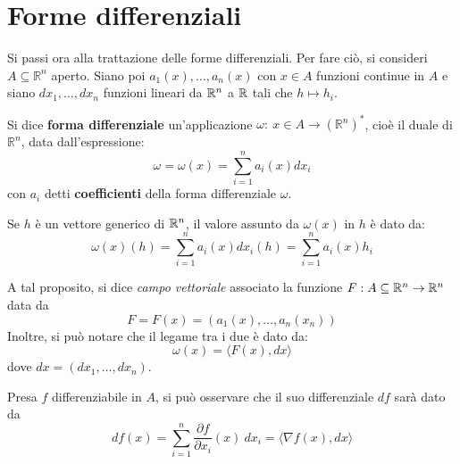 \chapter{Forme differenziali}
Si passi ora alla trattazione delle forme differenziali.
Per fare ciò, si consideri $A \subseteq \mathbb{R}^n$ aperto. Siano poi $a_1(x), \dots, a_n(x)$ con $x \in A$ funzioni continue in $A$ e siano $dx_1, \dots, dx_n$ funzioni lineari da $\mathbb{R}^n$ a $\mathbb{R}$ tali che $h \mapsto h_i$.
\begin{definition} \label{Def: Forma differenziale}
Si dice \textbf{forma differenziale} un'applicazione $\omega:\ x \in A \to  (\mathbb{R}^n)^*$, cioè il duale di $\mathbb{R}^n$, data dall'espressione:
\begin{equation}
    \omega= \omega(x)= \sum\limits_{i=1}^{n}{a_i(x)dx_i}
\end{equation}
con $a_i$ detti \textbf{coefficienti} della forma differenziale $\omega$.
\end{definition}
\begin{oss}
    Se $h$ è un vettore generico di $\mathbb{R}^n$, il valore assunto da $\omega(x)$ in $h$ è dato da:
    \begin{equation}
        \omega(x)(h)=\sum\limits_{i=1}^{n}{a_i(x)dx_i(h)}= \sum\limits_{i=1}^{n}{a_i(x)h_i}
    \end{equation}
\end{oss}
\begin{oss}
A tal proposito, si dice \textit{campo vettoriale} associato la funzione $F: A\subseteq \mathbb{R}^n \to \mathbb{R}^n$ data da
\begin{equation}
    F=F(x)=(a_1(x), \dots, a_n(x_n))
\end{equation}
Inoltre, si può notare che il legame tra i due è dato da:
\begin{equation} \label{Eq: Campo vettoriale}
    \omega(x)= \langle F(x), dx \rangle
\end{equation}
dove $dx= (dx_1,\dots, dx_n)$.
\end{oss}
\begin{oss}
Presa $f$ differenziabile in $A$, si può osservare che il suo differenziale $df$ sarà dato da
\begin{equation} \label{Eq: Differenziale}
    df(x)= \sum\limits_{i=1}^{n}{\frac{\partial f}{\partial x_i}(x)\ dx_i}= \langle \nabla f(x), dx\rangle
\end{equation}
\end{oss}

